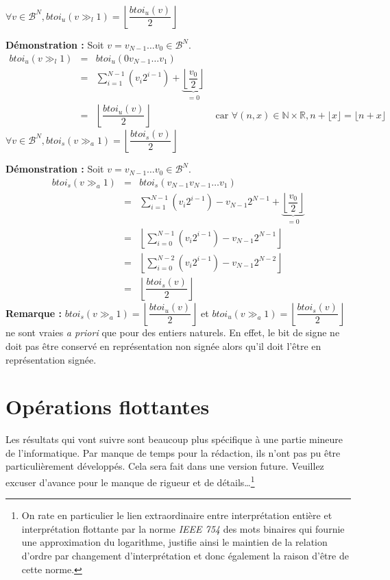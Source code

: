\documentclass[../../main.tex]{subfiles}
\begin{document}
\proposition{} $\forall{v\in{\mathcal{B}^{N}}}, btoi_{u}(v\gg_{l}1) = \left\lfloor\dfrac{btoi_{u}(v)}{2}\right\rfloor$

\textbf{Démonstration :} Soit $v = v_{N-1}\dots v_{0}\in{\mathcal{B}^{N}}$.
\[
\begin{array}{lcll}
btoi_{u}(v\gg_{l}1)  & = & btoi_{u}(0v_{N-1}\dots v_{1}) \\
& = & \displaystyle\sum_{i = 1}^{N-1}(v_{i}2^{i-1}) + \underbrace{\left\lfloor\dfrac{v_{0}}{2}\right\rfloor}_{=0} \\
& = &  \left\lfloor\dfrac{btoi_{u}(v)}{2}\right\rfloor & \text{ car $\forall{(n, x)}\in{\mathbb{N}\times{\mathbb{R}}}, n + \lfloor{x}\rfloor = \lfloor{n + x}\rfloor$}
\end{array}
\]
\proposition{} $\forall{v\in{\mathcal{B}^{N}}}, btoi_{s}(v\gg_{a}1) = \left\lfloor\dfrac{btoi_{s}(v)}{2}\right\rfloor$

\textbf{Démonstration :} Soit $v = v_{N-1}\dots v_{0}\in{\mathcal{B}^{N}}$.
\[
\begin{array}{lcl}
btoi_{s}(v\gg_{a}1)  & = & btoi_{s}(v_{N-1}v_{N-1}\dots v_{1}) \\
& = & \displaystyle\sum_{i = 1}^{N-1}(v_{i}2^{i-1}) - v_{N-1}2^{N-1} + \underbrace{\left\lfloor\dfrac{v_{0}}{2}\right\rfloor}_{=0} \\
& = &  \left\lfloor{\displaystyle\sum_{i = 0}^{N-1}(v_{i}2^{i-1}) - v_{N-1}2^{N-1}}\right\rfloor \\
& = &  \left\lfloor{\displaystyle\sum_{i = 0}^{N-2}(v_{i}2^{i-1}) - v_{N-1}2^{N-2}}\right\rfloor \\
& = & \left\lfloor\dfrac{btoi_{s}(v)}{2}\right\rfloor
\end{array}
\]
\textbf{Remarque :} $btoi_{s}(v\gg_{a}1) = \left\lfloor\dfrac{btoi_{u}(v)}{2}\right\rfloor$ et $btoi_{u}(v\gg_{a}1) = \left\lfloor\dfrac{btoi_{s}(v)}{2}\right\rfloor$ ne sont vraies \textit{a priori} que pour des entiers naturels. En effet, le bit de signe ne doit pas être conservé en représentation non signée alors qu'il doit l'être en représentation signée.
\section{Opérations flottantes}
Les résultats qui vont suivre sont beaucoup plus spécifique à une partie mineure de l'informatique. Par manque de temps pour la rédaction, ils n'ont pas pu être particulièrement développés. Cela sera fait dans une version future. Veuillez excuser d'avance pour le manque de rigueur et de détails\dots\footnote{On rate en particulier le lien extraordinaire entre interprétation entière et interprétation flottante par la norme \textit{IEEE 754} des mots binaires qui fournie une approximation du logarithme, justifie ainsi le maintien de la relation d'ordre par changement d'interprétation et donc également la raison d'être de cette norme.}
\end{document}
